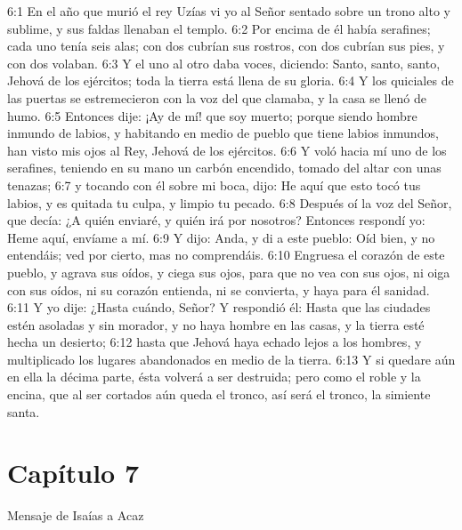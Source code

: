 6:1 En el año que murió el rey Uzías vi yo al Señor sentado sobre un trono alto y sublime, y sus faldas llenaban el templo. 
6:2 Por encima de él había serafines; cada uno tenía seis alas; con dos cubrían sus rostros, con dos cubrían sus pies, y con dos volaban. 
6:3 Y el uno al otro daba voces, diciendo: Santo, santo, santo, Jehová de los ejércitos; toda la tierra está llena de su gloria. 
6:4 Y los quiciales de las puertas se estremecieron con la voz del que clamaba, y la casa se llenó de humo. 
6:5 Entonces dije: ¡Ay de mí! que soy muerto; porque siendo hombre inmundo de labios, y habitando en medio de pueblo que tiene labios inmundos, han visto mis ojos al Rey, Jehová de los ejércitos. 
6:6 Y voló hacia mí uno de los serafines, teniendo en su mano un carbón encendido, tomado del altar con unas tenazas; 
6:7 y tocando con él sobre mi boca, dijo: He aquí que esto tocó tus labios, y es quitada tu culpa, y limpio tu pecado. 
6:8 Después oí la voz del Señor, que decía: ¿A quién enviaré, y quién irá por nosotros? Entonces respondí yo: Heme aquí, envíame a mí. 
6:9 Y dijo: Anda, y di a este pueblo: Oíd bien, y no entendáis; ved por cierto, mas no comprendáis. 
6:10 Engruesa el corazón de este pueblo, y agrava sus oídos, y ciega sus ojos, para que no vea con sus ojos, ni oiga con sus oídos, ni su corazón entienda, ni se convierta, y haya para él sanidad. 
6:11 Y yo dije: ¿Hasta cuándo, Señor? Y respondió él: Hasta que las ciudades estén asoladas y sin morador, y no haya hombre en las casas, y la tierra esté hecha un desierto; 
6:12 hasta que Jehová haya echado lejos a los hombres, y multiplicado los lugares abandonados en medio de la tierra. 
6:13 Y si quedare aún en ella la décima parte, ésta volverá a ser destruida; pero como el roble y la encina, que al ser cortados aún queda el tronco, así será el tronco, la simiente santa. 
\section*{Capítulo 7}
Mensaje de Isaías a Acaz 
 
